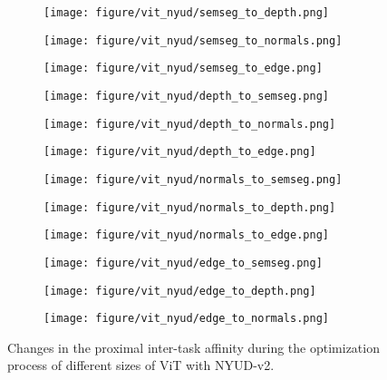 \begin{figure}[h]
    \centering
    \begin{subfigure}{0.24\textwidth}
        \texttt{[image: figure/vit\_nyud/semseg\_to\_depth.png]}
    \end{subfigure}
    \begin{subfigure}{0.24\textwidth}
        \texttt{[image: figure/vit\_nyud/semseg\_to\_normals.png]}
    \end{subfigure}
    \begin{subfigure}{0.24\textwidth}
        \texttt{[image: figure/vit\_nyud/semseg\_to\_edge.png]}
    \end{subfigure}
    \begin{subfigure}{0.24\textwidth}
        \texttt{[image: figure/vit\_nyud/depth\_to\_semseg.png]}
    \end{subfigure}
    \hfill
    \begin{subfigure}{0.24\textwidth}
        \texttt{[image: figure/vit\_nyud/depth\_to\_normals.png]}
    \end{subfigure}
    \begin{subfigure}{0.24\textwidth}
        \texttt{[image: figure/vit\_nyud/depth\_to\_edge.png]}
    \end{subfigure}
    \begin{subfigure}{0.24\textwidth}
        \texttt{[image: figure/vit\_nyud/normals\_to\_semseg.png]}
    \end{subfigure}
    \begin{subfigure}{0.24\textwidth}
        \texttt{[image: figure/vit\_nyud/normals\_to\_depth.png]}
    \end{subfigure}
    \hfill
    \begin{subfigure}{0.24\textwidth}
        \texttt{[image: figure/vit\_nyud/normals\_to\_edge.png]}
    \end{subfigure}
    \begin{subfigure}{0.24\textwidth}
        \texttt{[image: figure/vit\_nyud/edge\_to\_semseg.png]}
    \end{subfigure}
    \begin{subfigure}{0.24\textwidth}
        \texttt{[image: figure/vit\_nyud/edge\_to\_depth.png]}
    \end{subfigure}
    \begin{subfigure}{0.24\textwidth}
        \texttt{[image: figure/vit\_nyud/edge\_to\_normals.png]}
    \end{subfigure}
    \caption{Changes in the proximal inter-task affinity during the optimization process of different sizes of ViT with NYUD-v2.}
    \label{fig:proximal_vit_nyud}
\end{figure}
